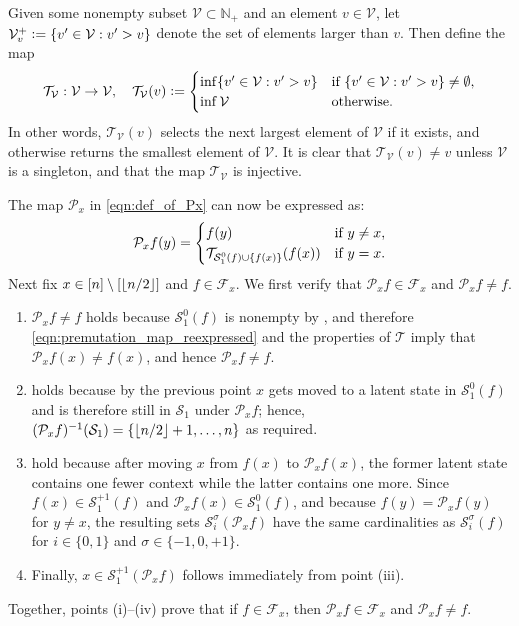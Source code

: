 \documentclass[11pt]{article}
\newcommand{\eqdef}{\vcentcolon=}
\newcommand{\mcF}{\mathcal{F}}
\newcommand{\mcP}{\mathcal{P}}
\newcommand{\mcS}{\mathcal{S}}
\newcommand{\mcT}{\mathcal{T}}
\newcommand{\mcV}{\mathcal{V}}
\newcommand{\mbbN}{\mathbb{N}}
\DeclarePairedDelimiter\floor{\lfloor}{\rfloor}
\theoremstyle{definition}
\theoremstyle{definition}
\begin{document}
Given some nonempty subset $\mcV\subset \mbbN_+$ and an element $v\in\mcV$, let $\mcV_v^+\eqdef \{v'\in\mcV:v'>v\}$ denote the set of elements larger than $v$.
Then define the map
\begin{equation}
	\mcT_{\mcV}:\mcV\rightarrow \mcV,
	\quad
	\mcT_{\mcV}(v)
	\eqdef
	\begin{cases}
		\inf
		\{v'\in\mcV:v'>v\}
		 &
		\textnormal{if }\{v'\in\mcV:v'>v\}\neq \emptyset, \\
		\inf
		\mcV
		 &
		\textnormal{otherwise}.
	\end{cases}
\end{equation}
In other words, $\mcT_{\mcV}(v)$ selects the next largest element of $\mcV$ if it exists, and otherwise returns the smallest element of $\mcV$.
It is clear that $\mcT_{\mcV}(v)\neq v$ unless $\mcV$ is a singleton, and that the map $\mcT_{\mcV}$ is injective.

The map $\mcP_x$ in \eqref{eqn:def_of_Px} can now be expressed as:
\begin{equation}
	\label{eqn:premutation_map_reexpressed}
	\mcP_xf(y)
	=
	\begin{cases}
		f(y)
		 &
		\textnormal{if }y\neq x, \\
		\mcT_{\mcS_1^0(f)\cup \{f(x)\}}(f(x))
		 &
		\textnormal{if }y = x.
	\end{cases}
\end{equation}
Next fix $x\in[n]\setminus[\floor{n/2}]$ and $f\in\mcF_x$.
We first verify that $\mcP_xf\in \mcF_x$ and $\mcP_xf\neq f$.
\begin{enumerate}[label=(\roman*)]
	\item
	$\mcP_xf\neq f$ holds because $\mcS_1^{0}(f)$ is nonempty by , and therefore \eqref{eqn:premutation_map_reexpressed} and the properties of $\mcT$ imply that $\mcP_xf(x)\neq f(x)$, and hence $\mcP_xf\neq f$.
	\item
	 holds because by the previous point $x$ gets moved to a latent state in $\mcS_1^0(f)$ and is therefore still in $\mcS_1$ under $\mcP_xf$; hence, $(\mcP_xf)^{-1}(\mcS_1)=\{\floor{n/2}+1,\ldots,n\}$ as required.
	\item
	 hold because after moving $x$ from $f(x)$ to $\mcP_xf(x)$, the former latent state contains one fewer context while the latter contains one more.
	Since $f(x)\in \mcS_1^{+1}(f)$ and $\mcP_xf(x)\in \mcS_1^{0}(f)$, and because $f(y)=\mcP_xf(y)$ for $y\neq x$, the resulting sets $\mcS_i^{\sigma}(\mcP_xf)$ have the same cardinalities as $\mcS_i^{\sigma}(f)$ for $i\in\{0,1\}$ and $\sigma\in\{-1,0,+1\}$.
	\item
	Finally, $x\in \mcS_1^{+1}(\mcP_xf)$ follows immediately from point (iii).
\end{enumerate}
Together, points (i)--(iv) prove that if $f\in\mcF_x$, then $\mcP_xf\in \mcF_x$ and $\mcP_xf\neq f$.
\end{document}
